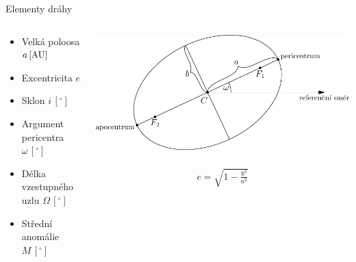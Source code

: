 \documentclass[xcolor=dvipsnames]{beamer}
\begin{document}
\begin{frame}{\secname}{Elementy dráhy}
\begin{columns}
\begin{column}{0.5\textwidth}
\begin{itemize}
\item Velká poloosa $a\,[{\rm AU}]$  
\item Excentricita $e$
\item Sklon $i\,[ ^\circ]$
\item Argument pericentra $\omega\,[ ^\circ]$
\item Délka vzestupného uzlu $\Omega\,[ ^\circ]$
\item Střední anomálie $M \,[ ^\circ]$
\end{itemize}
\end{column}
\begin{column}{0.5\textwidth}
\includegraphics[width=1.1\textwidth]{../asy/asteroidy-1.pdf}
\
\begin{align*}
	e=\sqrt{1-\frac{b^2}{a^2}}
\end{align*}
\end{column}
\end{columns}
\end{frame}
\end{document}
